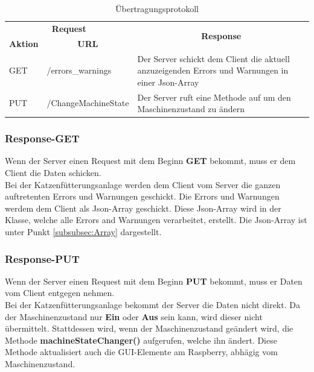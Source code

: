\begin{table}[htb]
\centering
\begin{tabular}{|l|l|p{300pt}|}
\hline
\multicolumn{2}{|c|}{\textbf{Request}}                                    & \multicolumn{1}{c|}{\multirow{2}{*}{\textbf{Response}}}                                          \\ \cline{1-2}
\multicolumn{1}{|c|}{\textbf{Aktion}} & \multicolumn{1}{c|}{\textbf{URL}} & \multicolumn{1}{c|}{}                                                                            \\ \hline
GET                                   & /errors\_warnings                 & Der Server schickt dem Client die aktuell anzuzeigenden Errors und Warnungen in einer Json-Array \\ \hline
PUT                                   & /ChangeMachineState               & Der Server ruft eine Methode auf um den Maschinenzustand zu ändern                               \\ \hline
\end{tabular}
\caption{Übertragungsprotokoll}
\label{Übertragungsprotokoll}
\end{table}

\newpage

\subsubsection{Response-GET}
Wenn der Server einen Request mit dem Beginn \textbf{GET} bekommt, muss er dem Client die Daten schicken. 
\\ Bei der Katzenfütterungsanlage werden dem Client vom Server die ganzen auftretenten Errors und Warnungen geschickt. Die Errors und Warnungen werdem dem Client als Json-Array geschickt. Diese Json-Array wird in der Klasse, welche alle Errors and Warnungen verarbeitet, erstellt. Die Json-Array ist unter Punkt \ref{subsubsec:Array} dargestellt. 

\subsubsection{Response-PUT}
Wenn der Server einen Request mit dem Beginn \textbf{PUT} bekommt, muss er Daten vom Client entgegen nehmen.
\\ Bei der Katzenfütterungsanlage bekommt der Server die Daten nicht direkt. Da der Maschinenzustand nur \textbf{Ein} oder \textbf{Aus} sein kann, wird dieser nicht übermittelt. Stattdessen wird, wenn der Maschinenzustand geändert wird, die Methode \textbf{machineStateChanger()} aufgerufen, welche ihn ändert. Diese Methode aktualisiert auch die GUI-Elemente am Raspberry, abhägig vom Maschinenzustand. 


